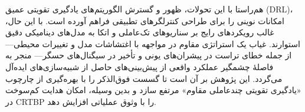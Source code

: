 هم‌راستا با این تحولات، ظهور و گسترش الگوریتم‌های یادگیری تقویتی عمیق (DRL)، امکانات نوینی را برای طراحی کنترلگرهای تطبیقی فراهم آورده است. با این حال، غالب رویکردهای رایج بر سناریوهای تک‌عاملی و اتکا به مدل‌های دینامیکی دقیق استوارند. غیاب یک استراتژی مقاوم در مواجهه با اغتشاشات مدل و تغییرات محیطی—از جمله خطای تراست در پیشران‌های یونی و تأخیر در سیگنال‌های حسگر— منجر به فاصلهٔ چشمگیر عملکرد واقعی از پیش‌بینی‌های حاصل از شبیه‌سازی‌های ایده‌آل می‌گردد. این پژوهش بر آن است تا گسست فوق‌الذکر را با بهره‌گیری از چارچوب «یادگیری تقویتی چندعاملی مقاوم» مرتفع سازد و بدین وسیله، امکان هدایت کم‌سوخت در CRTBP را با وثوق عملیاتی افزایش دهد.